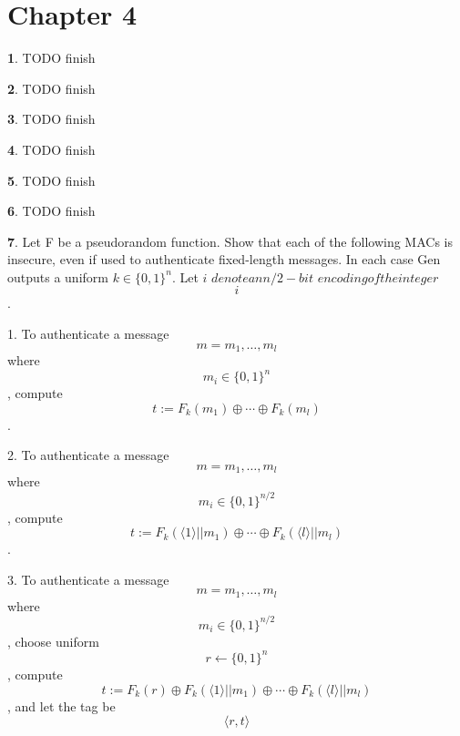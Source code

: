 \documentclass{article}
\theoremstyle{definition}
\theoremstyle{definition}
\theoremstyle{definition}
\newtheorem{solution-internal}{}[subsection]
\newenvironment{solution}{
  \begin{solution-internal}
}{
  \end{solution-internal}
}
\begin{document}
\section*{Chapter 4}
\setcounter{section}{4}
\setcounter{subsection}{4}
\setcounter{solution-internal}{0}
\begin{solution}
  TODO finish
\end{solution}
\begin{solution}
  TODO finish
\end{solution}
\begin{solution}
  TODO finish
\end{solution}
\begin{solution}
  TODO finish
\end{solution}
\begin{solution}
  TODO finish
\end{solution}
\begin{solution}
  TODO finish
\end{solution}
\begin{solution}
  Let F be a pseudorandom function. Show that each of the following MACs is insecure, even if used to authenticate fixed-length messages. In each case Gen outputs a uniform $k \in \{0, 1\}^n$. Let \langle $i$ \rangle 
  $denote an n/2-bit$
  \hspace{1mm} $encoding of the integer$ \hspace{1mm} $$i$$.
\newline
  
  1. To authenticate a message $$ m = m_1, \ldots ,m_l $$ where $$m_i \in \{0, 1\}^n$$, compute $$t := F_k(m_1) \oplus \cdots \oplus F_k(m_l)$$.
  
  2. To authenticate a message $$ m = m_1, \ldots ,m_l $$ where $$m_i \in \{0, 1\}^{n/2}$$, compute $$t := F_k(\langle 1 \rangle || m_1) \oplus \cdots \oplus F_k(\langle l \rangle || m_l)$$.
  
  3. To authenticate a message $$ m = m_1, \ldots ,m_l $$ where $$m_i \in \{0, 1\}^{n/2}$$, choose uniform $$r \leftarrow \{0, 1\}^n$$, compute $$t := F_k(r) \oplus F_k(\langle 1 \rangle || m_1) \oplus \cdots \oplus F_k(\langle l \rangle || m_l)$$, and let the tag be $$\langle r, t \rangle $$

\end{solution}
\end{document}
